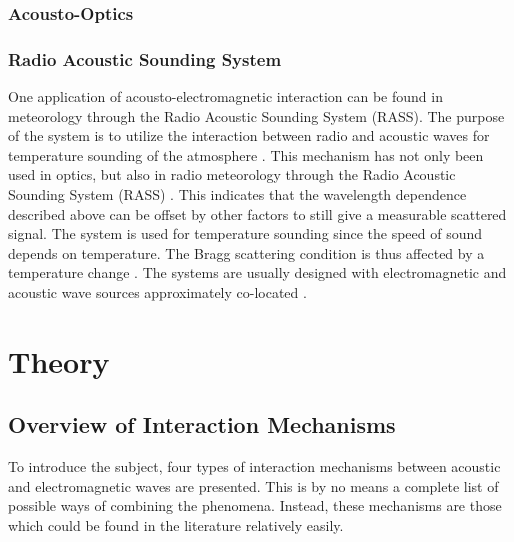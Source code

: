 \documentclass[11pt,twoside]{eitExjobb}
\begin{document}
	\subsection{Acousto-Optics}
	
	\subsection{Radio Acoustic Sounding System}
	One application of acousto-electromagnetic interaction can be found in meteorology through the Radio Acoustic Sounding System (RASS). The purpose of the system is to utilize the interaction between radio and acoustic waves for temperature sounding of the atmosphere .
	This mechanism has not only been used in optics, but also in radio meteorology through the Radio Acoustic Sounding System (RASS) \cite{Buerkle2007}. This indicates that the wavelength dependence described above can be offset by other factors to still give a measurable scattered signal. The system is used for temperature sounding since the speed of sound depends on temperature. The Bragg scattering condition is thus affected by a temperature change \cite{Marshall1972}. The systems are usually designed with electromagnetic and acoustic wave sources approximately co-located \cite{Marshall1972}.
	
	
	
	\chapter{Theory \label{ch:theory}}
	
	\section{Overview of Interaction Mechanisms}
	To introduce the subject, four types of interaction mechanisms between acoustic and electromagnetic waves are presented. This is by no means a complete list of possible ways of combining the phenomena. Instead, these mechanisms are those which could be found in the literature relatively easily.
	
\end{document}
